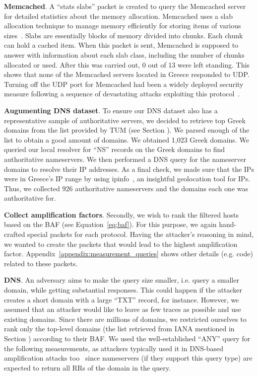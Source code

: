  \textbf{Memcached}. A ``stats slabs'' packet is created to query the Memcached server for detailed statistics about the memory allocation. Memcached uses a slab allocation technique to manage memory efficiently for storing items of various sizes~\cite{slab_allocation}. Slabs are essentially blocks of memory divided into chunks. Each chunk can hold a cached item. When this packet is sent, Memcached is supposed to answer with information about each slab class, including the number of chunks allocated or used. After this was carried out, 0 out of 13 were left standing. This shows that none of the Memcached servers located in Greece responded to UDP. Turning off the UDP port for Memcached had been a widely deployed security measure following a sequence of devastating attacks exploiting this protocol~\cite{amplification_hell}.
    

 \textbf{Augumenting DNS dataset}. To ensure our DNS dataset also has a representative sample of authoritative servers, we decided to retrieve top Greek domains from the list provided by TUM (see Section ). We parsed enough of the list to obtain a good amount of domains. We obtained 1,023 Greek domains. We queried our local resolver for ``NS'' records on the Greek domains to find authoritative nameservers. We then performed a DNS query for the nameserver domains to resolve their IP addresses. As a final check, we made sure that the IPs were in Greece's IP range by using ipinfo~\cite{ipinfo}, an insightful geolocation tool for IPs. Thus, we collected 926 authoritative nameservers and the domains each one was authoritative for.  

 \textbf{Collect amplification factors}. Secondly, we wish to rank the filtered hosts based on the BAF (see Equation~\eqref{eq:baf}). For this purpose, we again hand-crafted special packets for each protocol. Having the attacker's reasoning in mind, we wanted to create the packets that would lead to the highest amplification factor. Appendix~\ref{appendix:measurement_queries} shows other details (e.g. code) related to these packets.

 \textbf{DNS}. An adversary aims to make the query size smaller, i.e. query a smaller domain, while getting substantial responses. This could happen if the attacker creates a short domain with a large ``TXT'' record, for instance. However, we assumed that an attacker would like to leave as few traces as possible and use existing domains. Since there are millions of domains, we restricted ourselves to rank only the top-level domains (the list retrieved from IANA mentioned in Section ) according to their BAF. We used the well-established ``ANY'' query for the following measurements, as attackers typically used it in DNS-based amplification attacks too~\cite{van_der_toorn_anyway_2021} since nameservers (if they support this query type) are expected to return all RRs of the domain in the query. 
    
